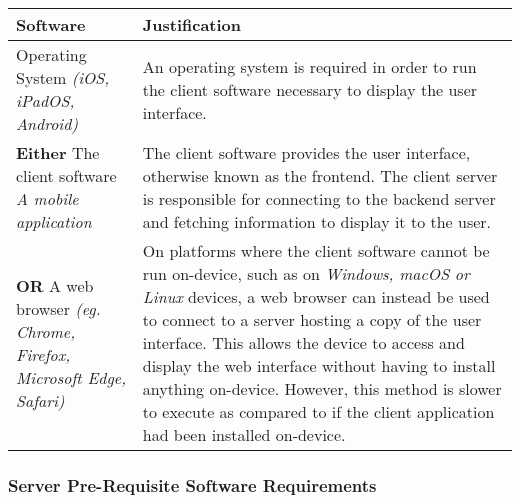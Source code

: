 \documentclass[../../../main.tex]{subfiles}
\begin{document}
\begin{tabular}{ |p{}|p{}| }
    \hline
    \textbf{Software}                                      & \textbf{Justification}                                                                                                                                                                                      \\
    \hline
    Operating System \newline
    \textit{(iOS, iPadOS, Android)}                        &
    An operating system is required in order to run the client software necessary to display the user interface.                                                                                                                                                         \\
    \hline
    \textbf{Either} The client software \newline
    \textit{A mobile application}                          & The client software provides the user interface, otherwise known as the frontend. The client server is responsible for connecting to the backend server and fetching information to display it to the user. \\
    \hline
    \textbf{OR} A web browser \newline
    \textit{(eg. Chrome, Firefox, Microsoft Edge, Safari)} &
    On platforms where the client software cannot be run on-device, such as on \textit{Windows, macOS or Linux} devices, a web browser can instead be used to connect to a server hosting a copy of the user interface. This allows the device to access and display the web interface without having to install anything on-device.
    \newline However, this method is slower to execute as compared to if the client application had been installed on-device.                                                                                                                                            \\
    \hline
\end{tabular}

\subsubsection{Server Pre-Requisite Software Requirements}
\end{document}
